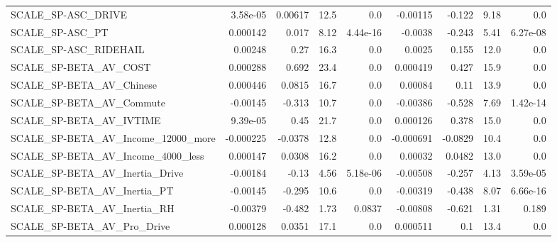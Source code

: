 \begin{tabular}{lrrrrrrrr}
SCALE\_SP-ASC\_DRIVE                                 &    3.58e-05 &      0.00617 &     12.5 &      0.0 &   -0.00115 &      -0.122 &         9.18 &           0.0 \\
SCALE\_SP-ASC\_PT                                    &    0.000142 &        0.017 &     8.12 & 4.44e-16 &    -0.0038 &      -0.243 &         5.41 &      6.27e-08 \\
SCALE\_SP-ASC\_RIDEHAIL                              &     0.00248 &         0.27 &     16.3 &      0.0 &     0.0025 &       0.155 &         12.0 &           0.0 \\
SCALE\_SP-BETA\_AV\_COST                              &    0.000288 &        0.692 &     23.4 &      0.0 &   0.000419 &       0.427 &         15.9 &           0.0 \\
SCALE\_SP-BETA\_AV\_Chinese                           &    0.000446 &       0.0815 &     16.7 &      0.0 &    0.00084 &        0.11 &         13.9 &           0.0 \\
SCALE\_SP-BETA\_AV\_Commute                           &    -0.00145 &       -0.313 &     10.7 &      0.0 &   -0.00386 &      -0.528 &         7.69 &      1.42e-14 \\
SCALE\_SP-BETA\_AV\_IVTIME                            &    9.39e-05 &         0.45 &     21.7 &      0.0 &   0.000126 &       0.378 &         15.0 &           0.0 \\
SCALE\_SP-BETA\_AV\_Income\_12000\_more                 &   -0.000225 &      -0.0378 &     12.8 &      0.0 &  -0.000691 &     -0.0829 &         10.4 &           0.0 \\
SCALE\_SP-BETA\_AV\_Income\_4000\_less                  &    0.000147 &       0.0308 &     16.2 &      0.0 &    0.00032 &      0.0482 &         13.0 &           0.0 \\
SCALE\_SP-BETA\_AV\_Inertia\_Drive                     &    -0.00184 &        -0.13 &     4.56 & 5.18e-06 &   -0.00508 &      -0.257 &         4.13 &      3.59e-05 \\
SCALE\_SP-BETA\_AV\_Inertia\_PT                        &    -0.00145 &       -0.295 &     10.6 &      0.0 &   -0.00319 &      -0.438 &         8.07 &      6.66e-16 \\
SCALE\_SP-BETA\_AV\_Inertia\_RH                        &    -0.00379 &       -0.482 &     1.73 &   0.0837 &   -0.00808 &      -0.621 &         1.31 &         0.189 \\
SCALE\_SP-BETA\_AV\_Pro\_Drive                         &    0.000128 &       0.0351 &     17.1 &      0.0 &   0.000511 &         0.1 &         13.4 &           0.0 \\

\end{tabular}
